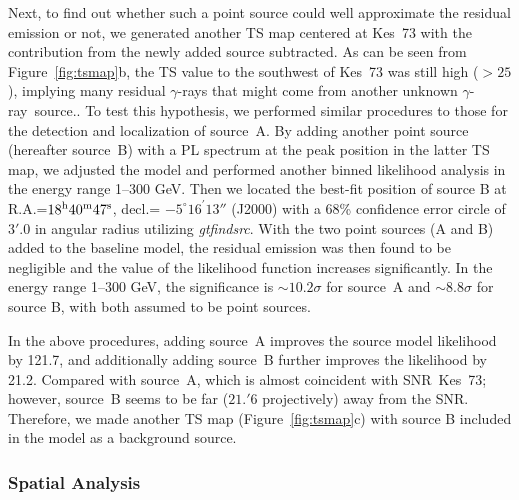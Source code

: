 \documentclass[12pt,preprint]{aastex}
\newcommand{\RA}[3]{{#1}^{{\rm h}}{#2}^{{\rm m}}{#3}^{\rm s}}
\newcommand{\decl}[3]{{#1}^{\circ}{#2}^{\prime}{#3}''}
\newcommand{\gray}{{\rm $\gamma$-ray}}
\begin{document}
Next, to find out whether such a point source 
could well approximate the residual emission or not,
we generated another TS map centered at Kes~73 
with the contribution from  the newly added source subtracted. 
As can be seen from Figure~\ref{fig:tsmap}b, 
the TS value  to the southwest of Kes~73 was still high ($>25$),
implying many residual {\gray}s that might 
come from another unknown \gray\ source.. 
To test this hypothesis, we performed similar procedures
to those for the detection and localization of source~A.
By adding another point source (hereafter source~B) 
with a PL spectrum at the peak position in the latter TS map,
we adjusted the model and performed another binned likelihood 
analysis in the energy range 1--300 GeV.
Then we located the best-fit position of source B 
at R.A.=$\RA{18}{40}{47}$, decl.= $\decl{-5}{16}{13}$ (J2000) 
with a 68\% confidence error circle of $3'.0$ in angular radius
utilizing \textit{gtfindsrc}.
With the two point sources (A and B) added to the baseline model, 
the residual emission was then found to be negligible and
 the value of the likelihood function increases significantly.
In the energy range 1--300 GeV, the significance 
is  $\sim 10.2\sigma$ for source~A and $\sim 8.8\sigma$ for source B,
 with  both assumed to be point sources.
 
 
In the above procedures, adding source~A improves the source model likelihood
by 121.7, and additionally adding source~B further improves the likelihood
by 21.2.
Compared with source~A, which is almost coincident with SNR~Kes~73;
however, 
source~B seems to be far ($21.'6$ projectively) away from the 
SNR.  Therefore, we made another TS map (Figure~\ref{fig:tsmap}c) 
 with source B included in the model as a background source.


 


\subsubsection{Spatial Analysis}
\label{subsec:spa}
\end{document}
